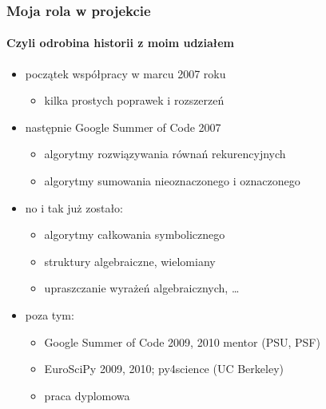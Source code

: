 \documentclass[10pt]{beamer}
\begin{document}
\begin{frame}
    \frametitle{Moja rola w projekcie}
    \framesubtitle{Czyli odrobina historii z moim udziałem}

    \begin{itemize}
        \item początek współpracy w marcu 2007 roku
            \begin{itemize}
                \item kilka prostych poprawek i rozszerzeń
            \end{itemize}
            \pause
        \item następnie Google Summer of Code 2007
            \begin{itemize}
                \item algorytmy rozwiązywania równań rekurencyjnych
                \item algorytmy sumowania nieoznaczonego i oznaczonego
            \end{itemize}
            \pause
        \item no i tak już zostało:
            \begin{itemize}
                \item algorytmy całkowania symbolicznego
                \item struktury algebraiczne, wielomiany
                \item upraszczanie wyrażeń algebraicznych, \ldots
            \end{itemize}
            \pause
        \item poza tym:
            \begin{itemize}
                \item Google Summer of Code 2009, 2010 mentor (PSU, PSF)
                \item EuroSciPy 2009, 2010; py4science (UC Berkeley)
                \item praca dyplomowa
            \end{itemize}
    \end{itemize}
\end{frame}
\end{document}
